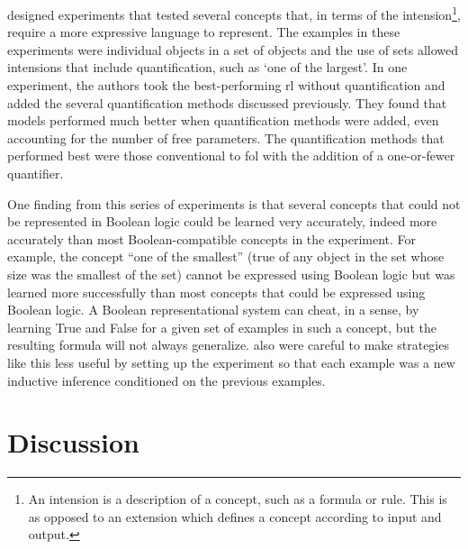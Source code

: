 \documentclass[doc,floatsintext]{apa6}
\begin{document}
\citet{piantadositg2015} designed experiments that tested several concepts that, in terms of the intension\footnote{
An intension is a description of a concept, such as a formula or rule. This is as opposed to an extension which defines a concept according to input and output.
}, require a more expressive language to represent.
The examples in these experiments were individual objects in a set of objects and the use of sets allowed intensions that include quantification, such as `one of the largest'.
In one experiment, the authors took the best-performing \ac{rl} without quantification and added the several quantification methods discussed previously. They found that models performed much better when quantification methods were added, even accounting for the number of free parameters. The quantification methods that performed best were those conventional to \ac{fol} with the addition of a one-or-fewer quantifier.

One finding from this series of experiments is that several concepts that could not be represented in Boolean logic could be learned very accurately, indeed more accurately than most Boolean-compatible concepts in the experiment.
For example, the concept ``one of the smallest'' (true of any object in the set whose size was the smallest of the set) cannot be expressed using Boolean logic but was learned more successfully than most concepts that could be expressed using Boolean logic.
A Boolean representational system can cheat, in a sense, by learning True and False for a given set of examples in such a concept, but the resulting formula will not always generalize.
\citeauthor{piantadositg2015} also were careful to make strategies like this less useful by setting up the experiment so that each example was a new inductive inference conditioned on the previous examples. 




\section{Discussion}
\end{document}
